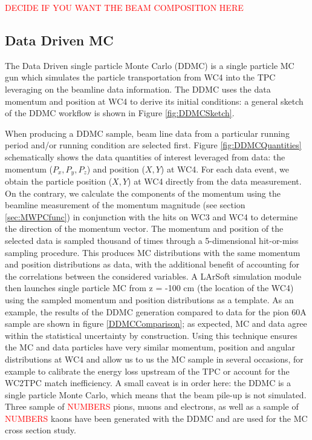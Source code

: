\textcolor{red}{DECIDE IF YOU WANT THE BEAM COMPOSITION HERE}


\subsection{Data Driven MC}\label{sec:DDMC}
The Data Driven single particle Monte Carlo (DDMC) is a single particle MC gun which simulates the particle transportation from WC4 into the TPC leveraging on the beamline data information. The DDMC uses the data momentum and position at WC4 to derive its initial conditions: a general sketch of the DDMC workflow is shown in Figure \ref{fig:DDMCSketch}.

When producing a DDMC sample, beam line data from a particular running period and/or running condition are selected first. Figure \ref{fig:DDMCQuantities}  schematically shows the data quantities of interest leveraged from data: the momentum ($P_x, P_y, P_z$) and position ($X, Y$) at WC4. For each data event, we obtain the particle position ($X, Y$) at WC4 directly from the data measurement. On the contrary, we calculate the components of the momentum using the beamline measurement of the momentum magnitude (see section \ref{sec:MWPCfunc}) in conjunction with the hits on WC3 and WC4 to determine the direction of the momentum vector. The momentum and position of the selected data is sampled thousand of times through a 5-dimensional hit-or-miss sampling procedure. This produces MC distributions with the same momentum and position distributions as data, with the additional benefit of accounting for the correlations between the considered variables. A LArSoft simulation module then launches single particle MC from z = -100 cm (the location of the WC4) using the sampled momentum and position distributions as a template. 
As an example, the results of the DDMC generation compared to data for the pion 60A sample are shown in figure \ref{DDMCComparison}; as expected, MC and data agree within the statistical uncertainty by construction. Using this technique ensures the MC and data particles have very similar momentum, position and angular distributions at WC4 and allow us to us the MC sample in several occasions, for example to calibrate the energy loss upstream of the TPC or account for the WC2TPC match inefficiency. A small caveat is in order here: the DDMC is a single particle Monte Carlo, which means that the beam pile-up is not simulated. 
Three sample of \textcolor{red}{NUMBERS} pions, muons and electrons, as well as  a sample of \textcolor{red}{NUMBERS} kaons have been generated with the DDMC and are used for the MC cross section study.

